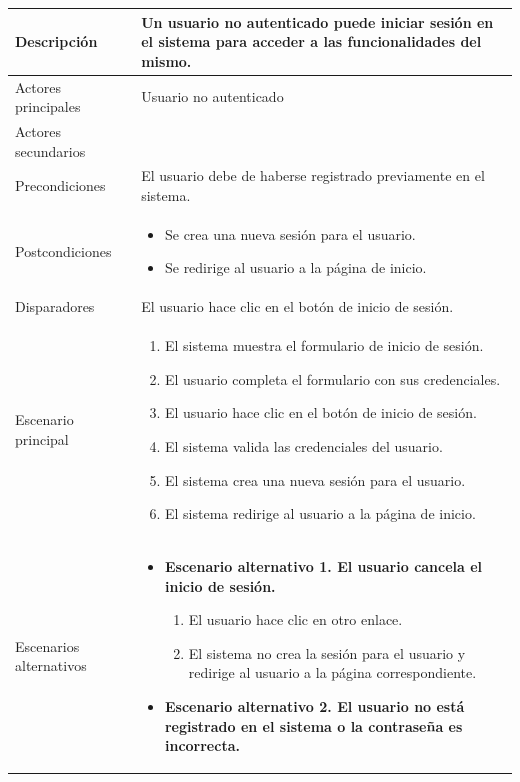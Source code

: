 \begin{longtable}{
    >{\columncolor{lightgreen!20}}p{4cm}
    p{12cm}
    }
    \midrule
    Descripción & Un usuario no autenticado puede iniciar sesión en el sistema para acceder a las funcionalidades del mismo. \\
    \midrule
    Actores principales & Usuario no autenticado \\
    \midrule
    Actores secundarios &  \\
    \midrule
    Precondiciones & El usuario debe de haberse registrado previamente en el sistema. \\
    \midrule
    Postcondiciones & \begin{itemize}[nosep,leftmargin=*]
        \item Se crea una nueva sesión para el usuario.
        \item Se redirige al usuario a la página de inicio.
    \end{itemize} \\
    \midrule
    Disparadores & El usuario hace clic en el botón de inicio de sesión. \\
    \midrule
    Escenario principal & \begin{enumerate}[nosep,leftmargin=*]
        \item El sistema muestra el formulario de inicio de sesión.
        \item El usuario completa el formulario con sus credenciales.
        \item El usuario hace clic en el botón de inicio de sesión.
        \item El sistema valida las credenciales del usuario.
        \item El sistema crea una nueva sesión para el usuario.
        \item El sistema redirige al usuario a la página de inicio.
    \end{enumerate} \\
    \midrule
    Escenarios alternativos & 
    \begin{itemize}[nosep,leftmargin=*]
      \item \textbf{Escenario alternativo 1. El usuario cancela el inicio de sesión.}
      \begin{enumerate}[nosep,leftmargin=*]
          \item El usuario hace clic en otro enlace.
          \item El sistema no crea la sesión para el usuario y redirige al usuario a la página correspondiente.
      \end{enumerate}
      \item \textbf{Escenario alternativo 2. El usuario no está registrado en el sistema o la contraseña es incorrecta.}

\end{itemize}
\end{longtable}
